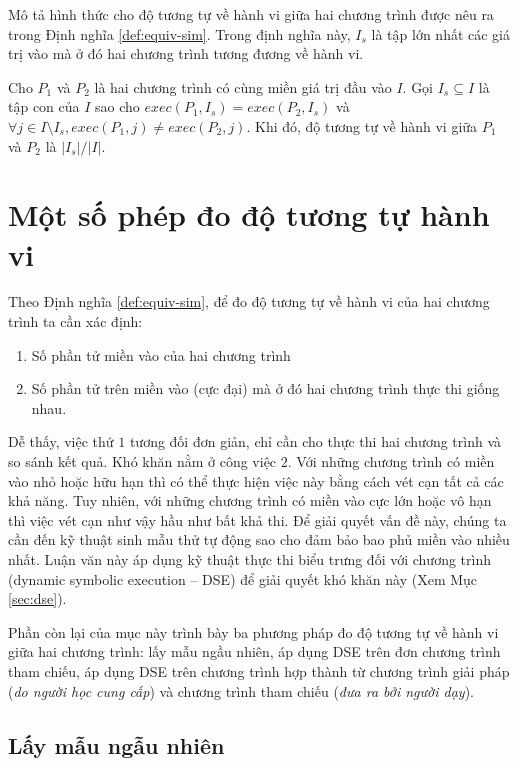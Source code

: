 Mô tả hình thức cho độ tương tự về hành vi giữa hai chương trình được
nêu ra trong Định nghĩa \ref{def:equiv-sim}. Trong định nghĩa này,
$I_s$ là tập lớn nhất các giá trị vào mà ở đó hai chương trình tương
đương về hành vi.
    
\begin{definition}
  \label{def:equiv-sim}
  Cho $P_{1}$ và $P_{2}$ là hai chương trình có cùng miền giá trị đầu
  vào $I$. Gọi $I_{s} \subseteq I$ là tập con của $I$ sao cho
  $exec(P_{1}, I_{s}) = exec(P_{2}, I_{s})$ và
  $\forall j \in I \setminus I_{s}, exec(P_{1}, j) \neq exec(P_{2},
  j)$. Khi đó, độ tương tự về hành vi giữa $P_1$ và $P_2$ là $|I_s|/|I|$.
\end{definition}

\section{Một số phép đo độ tương tự hành vi}
\label{sec:metrics}

Theo Định nghĩa \ref{def:equiv-sim}, để đo độ tương tự về hành vi của
hai chương trình ta cần xác định:
\begin{enumerate}
\item Số phần tử miền vào của hai chương trình
\item Số phần tử trên miền vào (cực đại) mà ở đó hai chương trình thực thi giống nhau.
\end{enumerate}
Dễ thấy, việc thứ $1$ tương đối đơn giản, chỉ cần cho thực thi hai
chương trình và so sánh kết quả. Khó khăn nằm ở công việc $2$. Với
những chương trình có miền vào nhỏ hoặc hữu hạn thì có thể thực hiện
việc này bằng cách vét cạn tất cả các khả năng. Tuy nhiên, với những
chương trình có miền vào cực lớn hoặc vô hạn thì việc vét cạn như vậy
hầu như bất khả thi. Để giải quyết vấn đề này, chúng ta cần đến kỹ
thuật sinh mẫu thử tự động sao cho đảm bảo bao phủ miền vào nhiều
nhất. Luận văn này áp dụng kỹ thuật thực thi biểu trưng đối với chương
trình (dynamic symbolic execution -- DSE) để giải quyết khó khăn này
(Xem Mục \ref{sec:dse}).

Phần còn lại của mục này trình bày ba phương pháp đo độ tương tự về
hành vi giữa hai chương trình: lấy mẫu ngầu nhiên, áp dụng DSE trên
đơn chương trình tham chiếu, áp dụng DSE trên chương trình hợp thành
từ chương trình giải pháp (\emph{do người học cung cấp}) và chương
trình tham chiếu (\emph{đưa ra bởi người dạy}).

\subsection{Lấy mẫu ngẫu nhiên}

